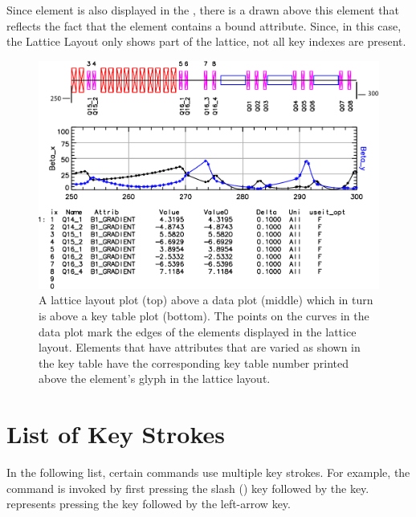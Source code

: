 {Since element  is also displayed in the ,
there is a  drawn above this element that reflects the fact
that the element contains a bound attribute. Since, in this case, the
Lattice Layout only shows part of the lattice, not all key indexes are
present.


\begin{figure}
  \centering
  \includegraphics[width=5in]{layout-graph-table.pdf}
  \caption[Example key table with a lattice layout and data plots.]
{A lattice layout plot (top) above a data plot (middle) 
which in turn is above a key table plot (bottom). The points on the
curves in the data plot mark the edges of the elements displayed in
the lattice layout. Elements that have attributes that are varied as
shown in the key table have the corresponding key table number printed
above the element's glyph in the lattice layout.}
  \label{f:key.table}
\end{figure}

\section{List of Key Strokes}
\label{s:keys}

In the following list, certain commands use multiple key strokes. For
example, the  command is invoked by first pressing the slash
() key followed by the  key. 
represents pressing the  key followed by the left-arrow key.

}
